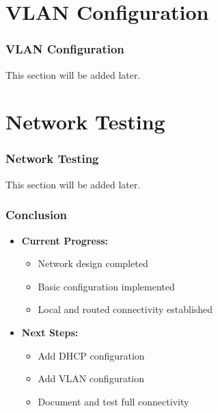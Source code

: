 \documentclass{beamer}
\begin{document}
\section{VLAN Configuration}
\begin{frame}[fragile,label=vlans]
\frametitle{VLAN Configuration}
This section will be added later.
\end{frame}

\section{Network Testing}
\begin{frame}[fragile,label=testing]
\frametitle{Network Testing}
This section will be added later.
\end{frame}

\begin{frame}
\frametitle{Conclusion}
\begin{itemize}
    \item \textbf{Current Progress:}
    \begin{itemize}
        \item Network design completed
        \item Basic configuration implemented
        \item Local and routed connectivity established
    \end{itemize}
    \item \textbf{Next Steps:}
    \begin{itemize}
        \item Add DHCP configuration
        \item Add VLAN configuration
        \item Document and test full connectivity
    \end{itemize}
\end{itemize}
\end{frame}
\end{document}
